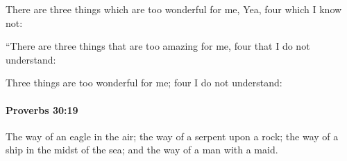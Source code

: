 			\begin{versebox}
					\item[BHS] 
					\item[ASV] There are three things which are too wonderful for me, Yea, four which I know not:
					\item[NIV] “There are three things that are too amazing for me, four that I do not understand:
					\item[NRSV] Three things are too wonderful for me; four I do not understand:
			\end{versebox}

		\paragraph{Proverbs 30:19} %
			\label{PROVERBS-30-19}

			The way of an eagle in the air; the way of a serpent upon a rock; the way of a ship in the midst of the sea; and the way of a man with a maid.

